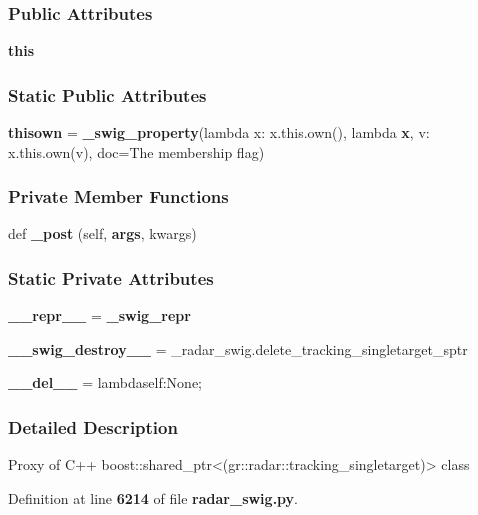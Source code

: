 \subsubsection*{Public Attributes}
\begin{DoxyCompactItemize}
\item 
{\bf this}
\end{DoxyCompactItemize}
\subsubsection*{Static Public Attributes}
\begin{DoxyCompactItemize}
\item 
{\bf thisown} = {\bf \+\_\+swig\+\_\+property}(lambda x\+: x.\+this.\+own(), lambda {\bf x}, v\+: x.\+this.\+own(v), doc=\textquotesingle{}The membership flag\textquotesingle{})
\end{DoxyCompactItemize}
\subsubsection*{Private Member Functions}
\begin{DoxyCompactItemize}
\item 
def {\bf \+\_\+post} (self, {\bf args}, kwargs)
\end{DoxyCompactItemize}
\subsubsection*{Static Private Attributes}
\begin{DoxyCompactItemize}
\item 
{\bf \+\_\+\+\_\+repr\+\_\+\+\_\+} = {\bf \+\_\+swig\+\_\+repr}
\item 
{\bf \+\_\+\+\_\+swig\+\_\+destroy\+\_\+\+\_\+} = \+\_\+radar\+\_\+swig.\+delete\+\_\+tracking\+\_\+singletarget\+\_\+sptr
\item 
{\bf \+\_\+\+\_\+del\+\_\+\+\_\+} = lambdaself\+:\+None;
\end{DoxyCompactItemize}


\subsubsection{Detailed Description}
\begin{DoxyVerb}Proxy of C++ boost::shared_ptr<(gr::radar::tracking_singletarget)> class\end{DoxyVerb}
 

Definition at line {\bf 6214} of file {\bf radar\+\_\+swig.\+py}.



